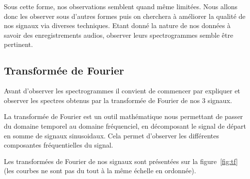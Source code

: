 Sous cette forme, nos observations semblent quand même limitées.
Nous allons donc les observer sous d'autres formes puis on cherchera à améliorer la qualité de nos signaux via diverses techniques. Etant donné la nature de nos données à savoir des enregistrements audios, observer leurs spectrogrammes semble être pertinent.

\hypertarget{Transformuxe9-de-Fourier}{%
\subsection{Transformée de Fourier}
\label{Transformuxe9-de-Fourier}}

Avant d'observer les spectrogrammes il convient de commencer par expliquer et observer les spectres obtenus par la transformée de Fourier de nos 3 signaux.

La transformée de Fourier est un outil mathématique nous permettant de passer du domaine temporel au domaine fréquenciel, en décomposant le signal de départ en somme de signaux sinusoidaux.
Cela permet d'observer les différentes composantes fréquentielles du signal.

Les transformées de Fourier de nos signaux sont présentées sur la figure~\ref{fig:tf} (les courbes ne sont pas du tout à la même échelle en ordonnée).

